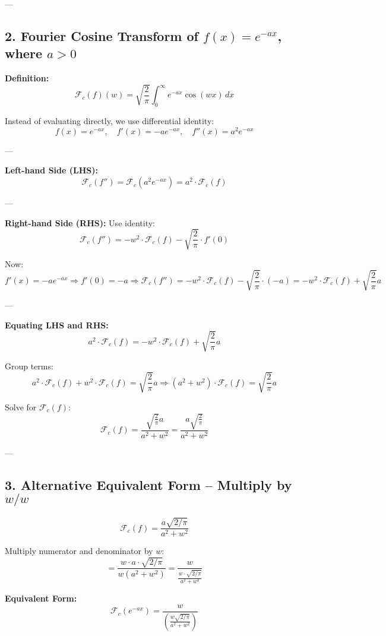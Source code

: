 \documentclass{article}
\begin{document}
---

\subsection*{2. Fourier Cosine Transform of \( f(x) = e^{-a x} \), where \( a > 0 \)}

\textbf{Definition:}
\[
\mathcal{F}_c(f)(w) = \sqrt{\frac{2}{\pi}} \int_0^\infty e^{-a x} \cos(wx) \, dx
\]

Instead of evaluating directly, we use differential identity:
\[
f(x) = e^{-a x}, \quad f'(x) = -a e^{-a x}, \quad f''(x) = a^2 e^{-a x}
\]

---

\textbf{Left-hand Side (LHS):}
\[
\mathcal{F}_c(f'') = \mathcal{F}_c(a^2 e^{-a x}) = a^2 \cdot \mathcal{F}_c(f)
\]

---

\textbf{Right-hand Side (RHS):}
Use identity:
\[
\mathcal{F}_c(f'') = -w^2 \cdot \mathcal{F}_c(f) - \sqrt{ \frac{2}{\pi} } \cdot f'(0)
\]

Now:
\[
f'(x) = -a e^{-a x} \Rightarrow f'(0) = -a
\Rightarrow \mathcal{F}_c(f'') = -w^2 \cdot \mathcal{F}_c(f) - \sqrt{ \frac{2}{\pi} } \cdot (-a)
= -w^2 \cdot \mathcal{F}_c(f) + \sqrt{ \frac{2}{\pi} } a
\]

---

\textbf{Equating LHS and RHS:}
\[
a^2 \cdot \mathcal{F}_c(f) = -w^2 \cdot \mathcal{F}_c(f) + \sqrt{ \frac{2}{\pi} } a
\]

Group terms:
\[
a^2 \cdot \mathcal{F}_c(f) + w^2 \cdot \mathcal{F}_c(f) = \sqrt{ \frac{2}{\pi} } a
\Rightarrow (a^2 + w^2) \cdot \mathcal{F}_c(f) = \sqrt{ \frac{2}{\pi} } a
\]

Solve for \( \mathcal{F}_c(f) \):
\[
\mathcal{F}_c(f) = \frac{ \sqrt{ \frac{2}{\pi} } a }{ a^2 + w^2 }
= \boxed{ \frac{ a \sqrt{ \frac{2}{\pi} } }{ a^2 + w^2 } }
\]

---

\subsection*{3. Alternative Equivalent Form – Multiply by \( w/w \)}

\[
\mathcal{F}_c(f) = \frac{ a \sqrt{2/\pi} }{ a^2 + w^2 }
\]

Multiply numerator and denominator by \( w \):
\[
= \frac{ w \cdot a \cdot \sqrt{2/\pi} }{ w(a^2 + w^2) }
= \frac{w}{ \frac{w \cdot \sqrt{2/\pi} }{ a^2 + w^2 } }
\]

\textbf{Equivalent Form:}
\[
\boxed{
\mathcal{F}_c(e^{-a x}) = \frac{w}{ \left( \frac{ w \sqrt{2/\pi} }{ a^2 + w^2 } \right) }
}
\]
\end{document}
